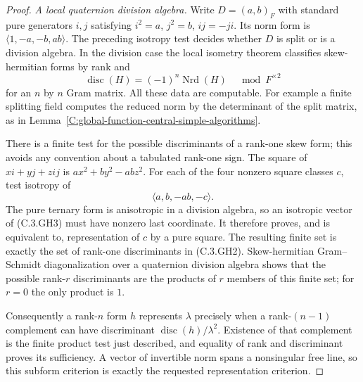 \begin{proof}
\emph{A local quaternion division algebra.}
Write $D=(a,b)_F$ with standard pure generators
$i,j$ satisfying $i^2=a$, $j^2=b$, $ij=-ji$.
Its norm form is
$\langle1,-a,-b,ab\rangle$.
The preceding isotropy test decides whether $D$
is split or is a division algebra.
In the division case the local isometry theorem
\cite[Theorem 2.4(i), pp.\ 6--7]{C-LewisUngerVanGeel2004}
classifies skew-hermitian forms by rank and
\[
        \operatorname{disc}(H)
          =(-1)^n\operatorname{Nrd}(H)\quad\bmod F^{\times2}
                                                               \tag{C.3.GH2}
\]
for an $n$ by $n$ Gram matrix.
All these data are computable.
For example a finite splitting field computes the
reduced norm by the determinant of the split matrix,
as in Lemma~\ref{C:global-function-central-simple-algorithms}.

There is a finite test for the possible discriminants
of a rank-one skew form; this avoids any convention
about a tabulated rank-one sign.
The square of $xi+yj+zij$ is
$ax^2+by^2-abz^2$.
For each of the four nonzero square classes $c$,
test isotropy of
\[
                         \langle a,b,-ab,-c\rangle .
                                                               \tag{C.3.GH3}
\]
The pure ternary form is anisotropic in a division
algebra, so an isotropic vector of (C.3.GH3) must
have nonzero last coordinate.
It therefore proves, and is equivalent to,
representation of $c$ by a pure square.
The resulting finite set is exactly the set of
rank-one discriminants in (C.3.GH2).
Skew-hermitian Gram--Schmidt diagonalization over
a quaternion division algebra shows that the
possible rank-$r$ discriminants are the products
of $r$ members of this finite set; for $r=0$
the only product is $1$.

Consequently a rank-$n$ form $h$ represents
$\lambda$ precisely when a rank-$(n-1)$
complement can have discriminant
$\operatorname{disc}(h)/\lambda^2$.
Existence of that complement is the finite
product test just described, and equality of
rank and discriminant proves its sufficiency.
A vector of invertible norm spans a nonsingular
free line, so this subform criterion is exactly
the requested representation criterion.


\end{proof}
